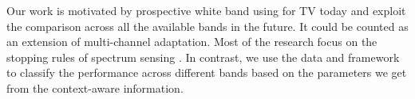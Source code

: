 Our work is motivated by prospective white band using for TV today and exploit the comparison across all the available bands in the future. 
It could be counted as an  extension of multi-channel adaptation. 
Most of the research focus on the stopping rules of spectrum sensing \cite{sabharwal2007opportunistic, OAR}. In contrast, we use the data and framework to classify the performance across different bands based on the parameters we get from the context-aware information.

